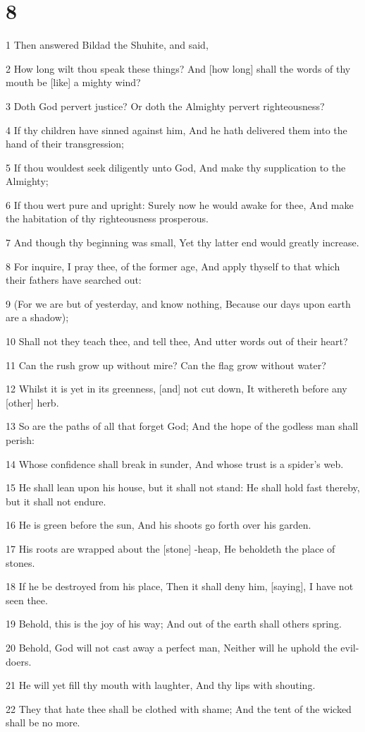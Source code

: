 \chapter{8}

\par 1 Then answered Bildad the Shuhite, and said,
\par 2 How long wilt thou speak these things? And [how long] shall the words of thy mouth be [like] a mighty wind?
\par 3 Doth God pervert justice? Or doth the Almighty pervert righteousness?
\par 4 If thy children have sinned against him, And he hath delivered them into the hand of their transgression;
\par 5 If thou wouldest seek diligently unto God, And make thy supplication to the Almighty;
\par 6 If thou wert pure and upright: Surely now he would awake for thee, And make the habitation of thy righteousness prosperous.
\par 7 And though thy beginning was small, Yet thy latter end would greatly increase.
\par 8 For inquire, I pray thee, of the former age, And apply thyself to that which their fathers have searched out:
\par 9 (For we are but of yesterday, and know nothing, Because our days upon earth are a shadow);
\par 10 Shall not they teach thee, and tell thee, And utter words out of their heart?
\par 11 Can the rush grow up without mire? Can the flag grow without water?
\par 12 Whilst it is yet in its greenness, [and] not cut down, It withereth before any [other] herb.
\par 13 So are the paths of all that forget God; And the hope of the godless man shall perish:
\par 14 Whose confidence shall break in sunder, And whose trust is a spider's web.
\par 15 He shall lean upon his house, but it shall not stand: He shall hold fast thereby, but it shall not endure.
\par 16 He is green before the sun, And his shoots go forth over his garden.
\par 17 His roots are wrapped about the [stone] -heap, He beholdeth the place of stones.
\par 18 If he be destroyed from his place, Then it shall deny him, [saying], I have not seen thee.
\par 19 Behold, this is the joy of his way; And out of the earth shall others spring.
\par 20 Behold, God will not cast away a perfect man, Neither will he uphold the evil-doers.
\par 21 He will yet fill thy mouth with laughter, And thy lips with shouting.
\par 22 They that hate thee shall be clothed with shame; And the tent of the wicked shall be no more.

